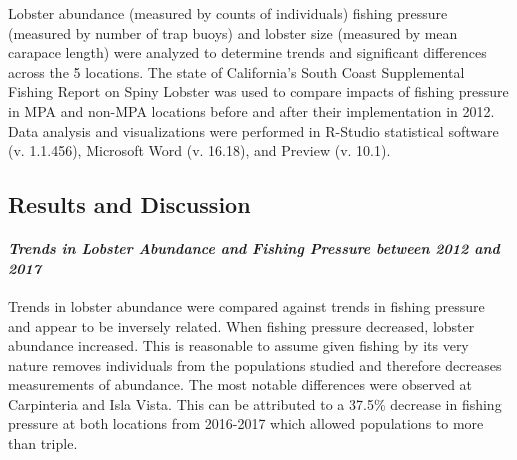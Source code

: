 \documentclass[]{article}
\let\oldparagraph\paragraph
\renewcommand{\paragraph}[1]{\oldparagraph{#1}\mbox{}}
\begin{document}
Lobster abundance (measured by counts of individuals) fishing pressure
(measured by number of trap buoys) and lobster size (measured by mean
carapace length) were analyzed to determine trends and significant
differences across the 5 locations. The state of California's South
Coast Supplemental Fishing Report on Spiny Lobster was used to compare
impacts of fishing pressure in MPA and non-MPA locations before and
after their implementation in 2012. Data analysis and visualizations
were performed in R-Studio statistical software (v. 1.1.456), Microsoft
Word (v. 16.18), and Preview (v. 10.1).

\subsection{Results and Discussion}\label{results-and-discussion}

\paragraph{\texorpdfstring{\emph{Trends in Lobster Abundance and Fishing
Pressure between 2012 and
2017}}{Trends in Lobster Abundance and Fishing Pressure between 2012 and 2017}}\label{trends-in-lobster-abundance-and-fishing-pressure-between-2012-and-2017}

Trends in lobster abundance were compared against trends in fishing
pressure and appear to be inversely related. When fishing pressure
decreased, lobster abundance increased. This is reasonable to assume
given fishing by its very nature removes individuals from the
populations studied and therefore decreases measurements of abundance.
The most notable differences were observed at Carpinteria and Isla
Vista. This can be attributed to a 37.5\% decrease in fishing pressure
at both locations from 2016-2017 which allowed populations to more than
triple.
\end{document}
